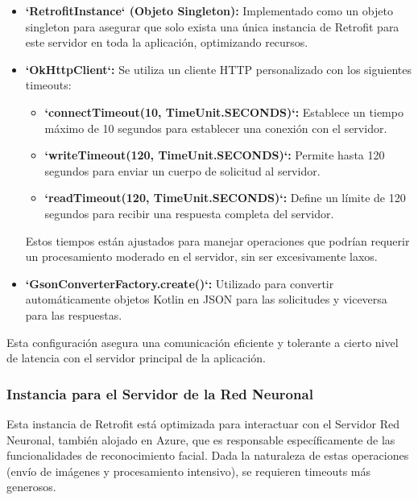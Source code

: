 \begin{itemize}
	\item \textbf{`RetrofitInstance` (Objeto Singleton):} Implementado como un objeto singleton para asegurar que solo exista una única instancia de Retrofit para este servidor en toda la aplicación, optimizando recursos.
	\item \textbf{`OkHttpClient`:} Se utiliza un cliente HTTP personalizado con los siguientes timeouts:
	\begin{itemize}
		\item \textbf{`connectTimeout(10, TimeUnit.SECONDS)`:} Establece un tiempo máximo de 10 segundos para establecer una conexión con el servidor.
		\item \textbf{`writeTimeout(120, TimeUnit.SECONDS)`:} Permite hasta 120 segundos para enviar un cuerpo de solicitud al servidor.
		\item \textbf{`readTimeout(120, TimeUnit.SECONDS)`:} Define un límite de 120 segundos para recibir una respuesta completa del servidor.
	\end{itemize}
	Estos tiempos están ajustados para manejar operaciones que podrían requerir un procesamiento moderado en el servidor, sin ser excesivamente laxos.
	\item \textbf{`GsonConverterFactory.create()`:} Utilizado para convertir automáticamente objetos Kotlin en JSON para las solicitudes y viceversa para las respuestas.
\end{itemize}
Esta configuración asegura una comunicación eficiente y tolerante a cierto nivel de latencia con el servidor principal de la aplicación.


\subsubsection{Instancia para el Servidor de la Red Neuronal}

Esta instancia de Retrofit está optimizada para interactuar con el Servidor Red Neuronal, también alojado en Azure, que es responsable específicamente de las funcionalidades de reconocimiento facial. Dada la naturaleza de estas operaciones (envío de imágenes y procesamiento intensivo), se requieren timeouts más generosos.

